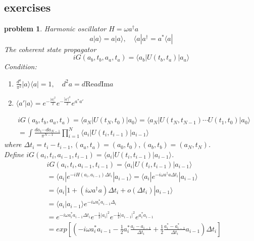 \documentclass[a4paper,11pt]{article}
\newtheorem{problem}{problem}[subsection]
\begin{document}
\subsection{exercises}
\begin{problem}
  Harmonic oscillator $H=\omega a^\dag a$
  \begin{equation*}
    a|a\rangle=a|a\rangle,\quad \langle a|a^\dag=a^*\langle a|
  \end{equation*}
  The coherent state propagator
  \begin{equation*}
    iG(a_b,t_b,a_a,t_a)=\langle a_b|U(t_b,t_a)|a_a\rangle
  \end{equation*}
  Condition:
  \begin{enumerate}[(1)]
    \item $\frac{d^a}{\pi^2}|a\rangle\langle a|=1,\quad d^2a=d\mathrm{Re}ad\mathrm{Im}a$
    \item $\langle a'|a\rangle=e^{-\frac{|a|^2}{2}}e^{-\frac{|a'|^2}{2}}e^{a^*a'}$
  \end{enumerate}
  \begin{equation*}
    \begin{split}
       &iG(a_b,t_b,a_a,t_a)=\langle a_N|U(t_N,t_0)|a_0\rangle=\langle a_N|U(t_N,t_{N-1})\cdots U(t_1,t_0)|a_0\rangle\\
         &=\int\frac{da_1\cdots da_{N-1}}{\pi^{N-1}}\prod_{i=1}^{N}\langle a_i|U(t_i,t_{i-1})|a_{i-1}\rangle
    \end{split}
  \end{equation*}
  where $\Delta t_i=t_i-t_{i-1},(a_a,t_a)=(a_0,t_0),(a_b,t_b)=(a_N,t_N)$.\\
  Define $iG(a_i,t_i,a_{i-1},t_{i-1})=\langle a_i|U(t_i,t_{i-1})|a_{i-1}\rangle$.
  \begin{equation*}
    \begin{split}
       &iG(a_i,t_i,a_{i-1},t_{i-1})=\langle a_i|U(t_i,t_{i-1})|a_{i-1}\rangle\\
         &=\langle a_i|e^{-iH(a_i,a_{i-1})\Delta t_i}|a_{i-1}\rangle=\langle a_i|e^{-i\omega a^\dag a\Delta t_i}|a_{i-1}\rangle\\
         &=\langle a_i|1+(i\omega a^\dag a)\Delta t_i+o(\Delta t_i)|a_{i-1}\rangle\\
         &=\langle a_i|a_{i-1}\rangle e^{-i\omega a_i^*a_{i-1}\Delta_i}\\
         &=e^{-i\omega a_i^*a_{i-1}\Delta t_i}e^{-\frac{1}{2}|a_i|^2}e^{-\frac{1}{2}|a_{i-1}|^2}e^{a^*_ia_{i-1}}\\
         &=exp\left[\left(-i\omega a_i^*a_{i-1}-\frac{1}{2}a_i^*\frac{a_i-a_{i-1}}{\Delta t_i}+\frac{1}{2}\frac{a_i^*-a_{i-1}^*}{\Delta t_i}a_{i-1}\right)\Delta t_i\right]

\end{split}
\end{equation*}
\end{problem}
\end{document}
